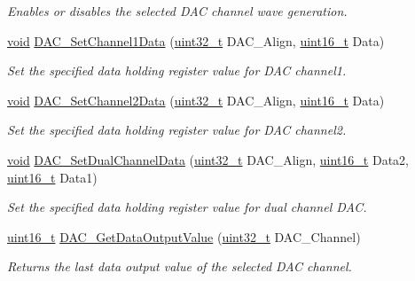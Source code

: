 \begin{DoxyCompactItemize}
\begin{DoxyCompactList}\small\item\em Enables or disables the selected D\+AC channel wave generation. \end{DoxyCompactList}\item 
\hyperlink{usb__devapi_8h_afabf60e7f57651d6d595a02c75f07cd0}{void} \hyperlink{group___d_a_c___private___functions_gad06b4230d2b17d1d13f41dce4c782461}{D\+A\+C\+\_\+\+Set\+Channel1\+Data} (\hyperlink{_p_e___types_8h_a33594304e786b158f3fb30289278f5af}{uint32\+\_\+t} D\+A\+C\+\_\+\+Align, \hyperlink{_p_e___types_8h_a1f1825b69244eb3ad2c7165ddc99c956}{uint16\+\_\+t} Data)
\begin{DoxyCompactList}\small\item\em Set the specified data holding register value for D\+AC channel1. \end{DoxyCompactList}\item 
\hyperlink{usb__devapi_8h_afabf60e7f57651d6d595a02c75f07cd0}{void} \hyperlink{group___d_a_c___private___functions_ga44e12006ec186791378d132da8541552}{D\+A\+C\+\_\+\+Set\+Channel2\+Data} (\hyperlink{_p_e___types_8h_a33594304e786b158f3fb30289278f5af}{uint32\+\_\+t} D\+A\+C\+\_\+\+Align, \hyperlink{_p_e___types_8h_a1f1825b69244eb3ad2c7165ddc99c956}{uint16\+\_\+t} Data)
\begin{DoxyCompactList}\small\item\em Set the specified data holding register value for D\+AC channel2. \end{DoxyCompactList}\item 
\hyperlink{usb__devapi_8h_afabf60e7f57651d6d595a02c75f07cd0}{void} \hyperlink{group___d_a_c___private___functions_ga4ca2cfdf56ab35a23f2517f23d7fbb24}{D\+A\+C\+\_\+\+Set\+Dual\+Channel\+Data} (\hyperlink{_p_e___types_8h_a33594304e786b158f3fb30289278f5af}{uint32\+\_\+t} D\+A\+C\+\_\+\+Align, \hyperlink{_p_e___types_8h_a1f1825b69244eb3ad2c7165ddc99c956}{uint16\+\_\+t} Data2, \hyperlink{_p_e___types_8h_a1f1825b69244eb3ad2c7165ddc99c956}{uint16\+\_\+t} Data1)
\begin{DoxyCompactList}\small\item\em Set the specified data holding register value for dual channel D\+AC. \end{DoxyCompactList}\item 
\hyperlink{_p_e___types_8h_a1f1825b69244eb3ad2c7165ddc99c956}{uint16\+\_\+t} \hyperlink{group___d_a_c___private___functions_ga51274838de1e5dd012a82d7f44d7a50b}{D\+A\+C\+\_\+\+Get\+Data\+Output\+Value} (\hyperlink{_p_e___types_8h_a33594304e786b158f3fb30289278f5af}{uint32\+\_\+t} D\+A\+C\+\_\+\+Channel)
\begin{DoxyCompactList}\small\item\em Returns the last data output value of the selected D\+AC channel. \end{DoxyCompactList}\end{DoxyCompactItemize}


